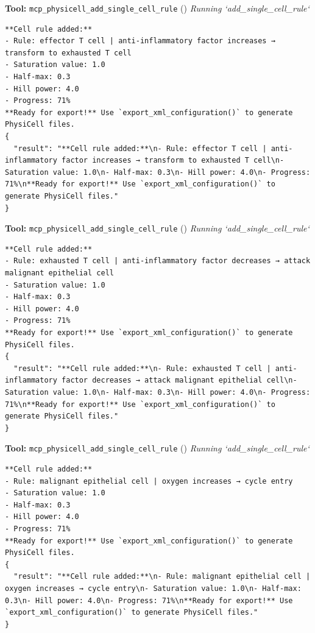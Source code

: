 \documentclass[11pt,a4paper]{article}
\begin{document}
\begin{toolokbox}
\textbf{Tool:} \texttt{mcp\_physicell\_add\_single\_cell\_rule} (\checkmark)
\textit{Running `add\_single\_cell\_rule`}
\begin{lstlisting}
**Cell rule added:**
- Rule: effector T cell | anti-inflammatory factor increases → transform to exhausted T cell
- Saturation value: 1.0
- Half-max: 0.3
- Hill power: 4.0
- Progress: 71%
**Ready for export!** Use `export_xml_configuration()` to generate PhysiCell files.
{
  "result": "**Cell rule added:**\n- Rule: effector T cell | anti-inflammatory factor increases → transform to exhausted T cell\n- Saturation value: 1.0\n- Half-max: 0.3\n- Hill power: 4.0\n- Progress: 71%\n**Ready for export!** Use `export_xml_configuration()` to generate PhysiCell files."
}
\end{lstlisting}
\end{toolokbox}
\begin{toolokbox}
\textbf{Tool:} \texttt{mcp\_physicell\_add\_single\_cell\_rule} (\checkmark)
\textit{Running `add\_single\_cell\_rule`}
\begin{lstlisting}
**Cell rule added:**
- Rule: exhausted T cell | anti-inflammatory factor decreases → attack malignant epithelial cell
- Saturation value: 1.0
- Half-max: 0.3
- Hill power: 4.0
- Progress: 71%
**Ready for export!** Use `export_xml_configuration()` to generate PhysiCell files.
{
  "result": "**Cell rule added:**\n- Rule: exhausted T cell | anti-inflammatory factor decreases → attack malignant epithelial cell\n- Saturation value: 1.0\n- Half-max: 0.3\n- Hill power: 4.0\n- Progress: 71%\n**Ready for export!** Use `export_xml_configuration()` to generate PhysiCell files."
}
\end{lstlisting}
\end{toolokbox}
\begin{toolokbox}
\textbf{Tool:} \texttt{mcp\_physicell\_add\_single\_cell\_rule} (\checkmark)
\textit{Running `add\_single\_cell\_rule`}
\begin{lstlisting}
**Cell rule added:**
- Rule: malignant epithelial cell | oxygen increases → cycle entry
- Saturation value: 1.0
- Half-max: 0.3
- Hill power: 4.0
- Progress: 71%
**Ready for export!** Use `export_xml_configuration()` to generate PhysiCell files.
{
  "result": "**Cell rule added:**\n- Rule: malignant epithelial cell | oxygen increases → cycle entry\n- Saturation value: 1.0\n- Half-max: 0.3\n- Hill power: 4.0\n- Progress: 71%\n**Ready for export!** Use `export_xml_configuration()` to generate PhysiCell files."
}
\end{lstlisting}
\end{toolokbox}
\end{document}
